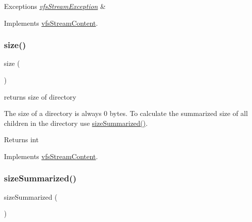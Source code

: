 \begin{DoxyExceptions}{Exceptions}
{\em \mbox{\hyperlink{classorg_1_1bovigo_1_1vfs_1_1vfs_stream_exception}{vfs\+Stream\+Exception}}} & \\
\hline
\end{DoxyExceptions}


Implements \mbox{\hyperlink{interfaceorg_1_1bovigo_1_1vfs_1_1vfs_stream_content_ab40397a8b5cf98ff82734ce7b1276363}{vfs\+Stream\+Content}}.

\mbox{\label{classorg_1_1bovigo_1_1vfs_1_1vfs_stream_directory_a775bfb88c1bb7975d67f277eade2a1b7}} 
\subsubsection{\texorpdfstring{size()}{size()}}
{\footnotesize\ttfamily size (\begin{DoxyParamCaption}{ }\end{DoxyParamCaption})}

returns size of directory

The size of a directory is always 0 bytes. To calculate the summarized size of all children in the directory use \mbox{\hyperlink{classorg_1_1bovigo_1_1vfs_1_1vfs_stream_directory_a1a6c7cd7f4f894823a9669c6edd52c39}{size\+Summarized()}}.

\begin{DoxyReturn}{Returns}
int 
\end{DoxyReturn}


Implements \mbox{\hyperlink{interfaceorg_1_1bovigo_1_1vfs_1_1vfs_stream_content_a775bfb88c1bb7975d67f277eade2a1b7}{vfs\+Stream\+Content}}.

\mbox{\label{classorg_1_1bovigo_1_1vfs_1_1vfs_stream_directory_a1a6c7cd7f4f894823a9669c6edd52c39}} 
\subsubsection{\texorpdfstring{size\+Summarized()}{sizeSummarized()}}
{\footnotesize\ttfamily size\+Summarized (\begin{DoxyParamCaption}{ }\end{DoxyParamCaption})}

